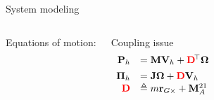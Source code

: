 \documentclass{beamer}
\begin{document}
\begin{frame}{System modeling}
\begin{columns}
\begin{block}{Equations of motion:}
		\end{block}
		\begin{block}{Coupling issue}
			\begin{equation*}
			\begin{array}{rl}
			\mathbf{P}_h & = \mathbf{M}\mathbf{V}_h + \mathbf{\color{red} D}^{\!\top} \mathbf{\Omega}\\[1ex]
			\mathbf{\Pi}_h & = \mathbf{J} \mathbf{\Omega} + \mathbf{\color{red} D}  \mathbf{V}_h \\
			\mathbf{\color{red}D} &\triangleq m \mathbf{r}_{G\times} +\mathbf{M}_A^{21}
			\end{array}
			\end{equation*}
		\end{block}
	\end{columns}

\end{frame}
\end{document}
